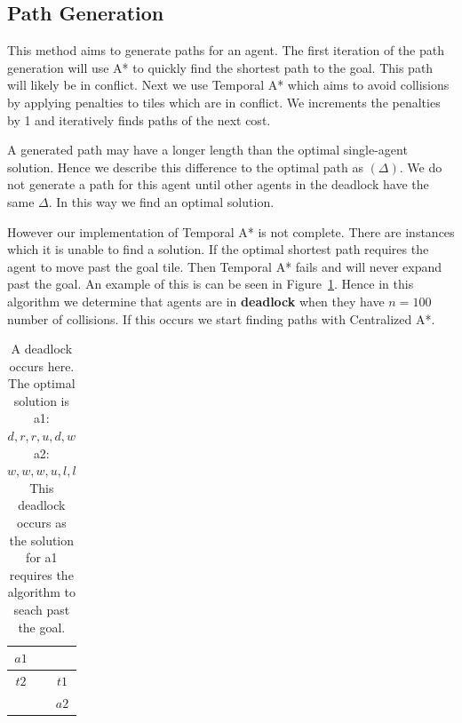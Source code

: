 \documentclass[a4paper,11pt]{article}
\begin{document}
\subsection{Path Generation} \label{sec:generating-paths}
This method aims to generate paths for an agent. The first iteration of the path generation will use A* to quickly find the shortest path to the goal. This path will likely be in conflict. Next we use Temporal A* which aims to avoid collisions by applying penalties to tiles which are in conflict. We increments the penalties by 1 and iteratively finds paths of the next cost. 

A generated path may have a longer length than the optimal single-agent solution. Hence we describe this difference to the optimal path as $(\Delta)$. We do not generate a path for this agent until other agents in the deadlock have the same $\Delta$. In this way we find an optimal solution.

However our implementation of Temporal A* is not complete. There are instances which it is unable to find a solution. If the optimal shortest path requires the agent to move past the goal tile. Then Temporal A* fails and will never expand past the goal. An example of this is can be seen in Figure~\ref{fig:deadlock}. Hence in this algorithm we determine that agents are in \textbf{deadlock} when they have $n=100$ number of collisions. If this occurs we start finding paths with Centralized A*. 


\begin{table}
	\centering
	\footnotesize
	\begin{tabular}{|c|c|c|}
		\hline
		$a1$ & \cellcolor{black} & \\ \hline
		$t2$ & & $t1$ \\ \hline
		& \cellcolor{black} & $a2$ \\ \hline
	\end{tabular}

	\caption{A deadlock occurs here. The optimal solution is 
		\\ a1: $d,r,r,u,d,w$
		\\ a2: $w,w,w,u,l,l$
		\\ This deadlock occurs as the solution for a1 requires the algorithm to seach past the goal.}
	\label{fig:deadlock}
\end{table}
\end{document}
